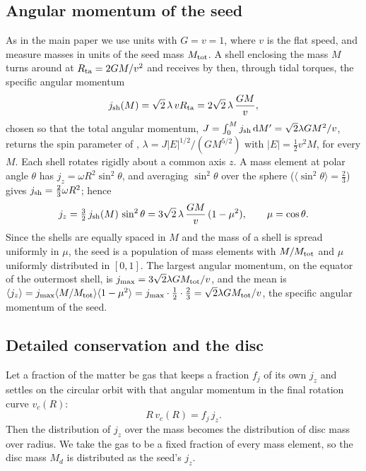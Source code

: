 \documentclass[11pt,a4paper]{article}
\newcommand{\dd}{\mathrm{d}}
\begin{document}
\subsection{Angular momentum of the seed}

As in the main paper we use units with $G=v=1$, where $v$ is the flat
speed, and measure masses in units of the seed mass $M_{\rm tot}$. A shell
enclosing the mass $M$ turns around at $R_{\rm ta}=2GM/v^2$ and receives
by then, through tidal torques, the specific angular momentum
\begin{equation}
  j_{\rm sh}(M)=\sqrt2\,\lambda\,vR_{\rm ta}=2\sqrt2\,\lambda\,\frac{GM}{v},
  \label{eq:jsh}
\end{equation}
chosen so that the total angular momentum, $J=\int_0^Mj_{\rm sh}\,\dd M'=\sqrt2\lambda GM^2/v$,
returns the spin parameter of \citet{Peebles1969},
$\lambda=J|E|^{1/2}/(GM^{5/2})$ with $|E|=\tfrac12v^2M$, for every $M$.
Each shell rotates rigidly about a common axis $z$. A mass element at
polar angle $\theta$ has $j_z=\omega R^2\sin^2\theta$, and averaging
$\sin^2\theta$ over the sphere ($\langle\sin^2\theta\rangle=\tfrac23$)
gives $j_{\rm sh}=\tfrac23\omega R^2$; hence
\begin{equation}
  j_z=\tfrac32\,j_{\rm sh}(M)\,\sin^2\theta
     =3\sqrt2\,\lambda\,\frac{GM}{v}\,(1-\mu^2),\qquad \mu=\cos\theta .
  \label{eq:jz}
\end{equation}
Since the shells are equally spaced in $M$ and the mass of a shell is
spread uniformly in $\mu$, the seed is a population of mass elements
with $M/M_{\rm tot}$ and $\mu$ uniformly distributed in $[0,1]$. The
largest angular momentum, on the equator of the outermost shell, is
$j_{\max}=3\sqrt2\lambda GM_{\rm tot}/v$, and the mean is
$\langle j_z\rangle=j_{\max}\langle M/M_{\rm tot}\rangle\langle1-\mu^2\rangle
=j_{\max}\cdot\tfrac12\cdot\tfrac23=\sqrt2\lambda GM_{\rm tot}/v$, the
specific angular momentum of the seed.

\subsection{Detailed conservation and the disc}

Let a fraction of the matter be gas that keeps a fraction $f_j$ of its
own $j_z$ and settles on the circular orbit with that angular momentum in
the final rotation curve $v_c(R)$:
\begin{equation}
  R\,v_c(R)=f_j\,j_z .
  \label{eq:orbit}
\end{equation}
Then the distribution of $j_z$ over the mass becomes the distribution of
disc mass over radius. We take the gas to be a fixed fraction of every
mass element, so the disc mass $M_d$ is distributed as the seed's
$j_z$.
\end{document}
